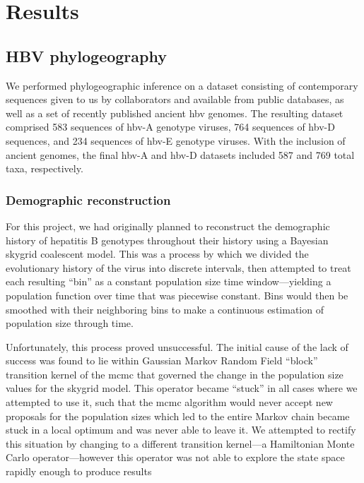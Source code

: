 \chapter{Results}\label{ch:results}

\section{HBV phylogeography}

We performed phylogeographic inference on a dataset consisting of contemporary sequences given to us by collaborators and available from public databases, as well as a set of recently published ancient \gls{hbv} genomes.
The resulting dataset comprised 583 sequences of \gls{hbv}-A genotype viruses, 764 sequences of \gls{hbv}-D sequences, and 234 sequences of \gls{hbv}-E genotype viruses.
With the inclusion of ancient genomes, the final \gls{hbv}-A and \gls{hbv}-D datasets included 587 and 769 total taxa, respectively.

\subsection{Demographic reconstruction}

For this project, we had originally planned to reconstruct the demographic history of hepatitis B genotypes throughout their history using a Bayesian skygrid coalescent model.
This was a process by which we divided the evolutionary history of the virus into discrete intervals, then attempted to treat each resulting ``bin'' as a constant population size time window---yielding a population function over time that was piecewise constant.
Bins would then be smoothed with their neighboring bins to make a continuous estimation of population size through time.

Unfortunately, this process proved unsuccessful.
The initial cause of the lack of success was found to lie within Gaussian Markov Random Field ``block'' transition kernel of the \gls{mcmc} that governed the change in the population size values for the skygrid model.
This operator became ``stuck'' in all cases where we attempted to use it, such that the \gls{mcmc} algorithm would never accept new proposals for the population sizes which led to the entire Markov chain became stuck in a local optimum and was never able to leave it.
We attempted to rectify this situation by changing to a different transition kernel---a Hamiltonian Monte Carlo operator---however this operator was not able to explore the state space rapidly enough to produce results

